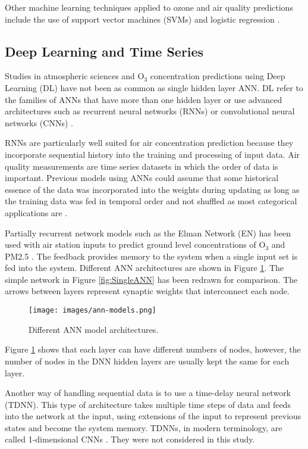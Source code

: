 Other machine learning techniques applied to ozone and air quality predictions include the use of support vector machines (SVMs) \citep{Luna2014, Papaleonidas2013, Singh2013} and logistic regression \citep{Zickus2002}. 

\subsection{Deep Learning and Time Series}
Studies in atmospheric sciences and O$_{3}$ concentration predictions using Deep Learning (DL) have not been as common as single hidden layer ANN. DL refer to the families of ANNs that have more than one hidden layer or use advanced architectures such as recurrent neural networks (RNNs) or convolutional neural networks (CNNs) \citep{Goodfellow2016}. 

RNNs are particularly well suited for air concentration prediction because they incorporate sequential history into the training and processing of input data. Air quality measurements are time series datasets in which the order of data is important. Previous models using ANNs could assume that some historical essence of the data was incorporated into the weights during updating as long as the training data was fed in temporal order and not shuffled as most categorical applications are \citep{Bengio2012}.

Partially recurrent network models such as the Elman Network (EN) has been used  with air station inputs to predict ground level concentrations of O$_{3}$ \citep{Biancofiore2015} and PM2.5 \citep{Biancofiore2017}. The feedback provides memory to the system when a single input set is fed into the system. Different ANN architectures are shown in Figure \ref{fig:ANNmodels}. The simple network in Figure \ref{fig:SingleANN} has been redrawn for comparison.  The arrows between layers represent synaptic weights that interconnect each node.
%
\begin{figure}
\centering
\texttt{[image: images/ann-models.png]} 
\caption{Different ANN model architectures.}
\label{fig:ANNmodels}
\end{figure}
%
Figure \ref{fig:ANNmodels} shows that each layer can have different numbers of nodes, however, the number of nodes in the DNN hidden layers are usually kept the same for each layer. 

Another way of handling sequential data is to use a time-delay neural network (TDNN). This type of architecture takes multiple time steps of data and feeds into the network at the input, using extensions of the input to represent previous states and become the system memory. TDNNs, in modern terminology, are called 1-dimensional CNNs \citep{Goodfellow2016}. They were not considered in this study.

